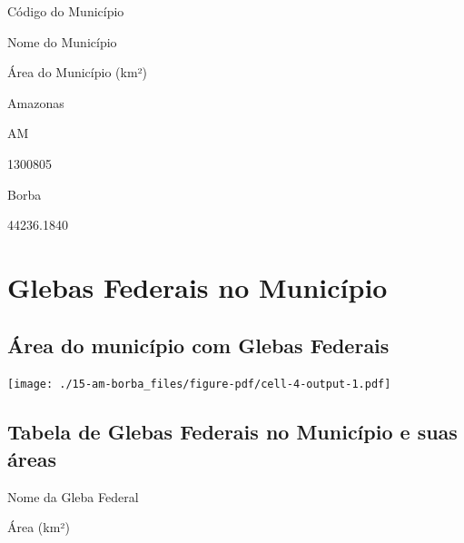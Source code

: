 \documentclass[
  letterpaper,
]{report}
\begin{document}
Código do Município

\n      

Nome do Município

\n      

Área do Município (km²)

\n    

\n  

\n  

\n    

\n      

Amazonas

\n      

AM

\n      

1300805

\n      

Borba

\n      

44236.1840

\n    

\n  

\n

\hypertarget{glebas-federais-no-municuxedpio-1}{%
\section{Glebas Federais no
Município}\label{glebas-federais-no-municuxedpio-1}}

\hypertarget{uxe1rea-do-municuxedpio-com-glebas-federais-1}{%
\subsection{Área do município com Glebas
Federais}\label{uxe1rea-do-municuxedpio-com-glebas-federais-1}}

\texttt{[image: ./15-am-borba\_files/figure-pdf/cell-4-output-1.pdf]}

\hypertarget{tabela-de-glebas-federais-no-municuxedpio-e-suas-uxe1reas-1}{%
\subsection{Tabela de Glebas Federais no Município e suas
áreas}\label{tabela-de-glebas-federais-no-municuxedpio-e-suas-uxe1reas-1}}

\n  

\n    

\n      

Nome da Gleba Federal

\n      

Área (km²)
\end{document}
